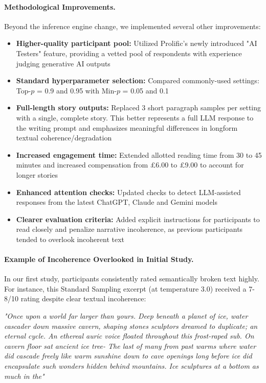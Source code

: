 \documentclass{article}
\begin{document}
\paragraph{Methodological Improvements.} Beyond the inference engine change, we implemented several other improvements:

\begin{itemize}
    \item \textbf{Higher-quality participant pool:} Utilized Prolific's newly introduced "AI Testers" feature, providing a vetted pool of respondents with experience judging generative AI outputs
    
    \item \textbf{Standard hyperparameter selection:} Compared commonly-used settings: Top-\(p\) = 0.9 and 0.95 with Min-\( p \) = 0.05 and 0.1
    
    \item \textbf{Full-length story outputs:} Replaced 3 short paragraph samples per setting with a single, complete story. This better represents a full LLM response to the writing prompt and emphasizes meaningful differences in longform textual coherence/degradation
    
    \item \textbf{Increased engagement time:} Extended allotted reading time from 30 to 45 minutes and increased compensation from £6.00 to £9.00 to account for longer stories
    
    \item \textbf{Enhanced attention checks:} Updated checks to detect LLM-assisted responses from the latest ChatGPT, Claude and Gemini models
    
    \item \textbf{Clearer evaluation criteria:} Added explicit instructions for participants to read closely and penalize narrative incoherence, as previous participants tended to overlook incoherent text
\end{itemize}

\paragraph{Example of Incoherence Overlooked in Initial Study.} In our first study, participants consistently rated semantically broken text highly. For instance, this Standard Sampling excerpt (at temperature 3.0) received a 7-8/10 rating despite clear textual incoherence:

\begin{tcolorbox}[
colback=gray!5,
colframe=gray!50,
boxrule=0.5pt,
arc=3pt,
left=8pt,
right=8pt,
top=8pt,
bottom=8pt
]
\small
\textit{"Once upon a world far larger than yours. Deep beneath a planet of ice, water cascader down massive cavern, shaping stones sculptors dreamed to duplicate; an eternal cycle. An ethereal auric voice floated throughout this frost-raped sub. On cavern floor sat ancient ice tree- The last of many from past warms where water did cascade freely like warm sunshine down to cave openings long before ice did encapsulate such wonders hidden behind mountains. Ice sculptures at a bottom as much in the"}
\end{tcolorbox}
\end{document}
